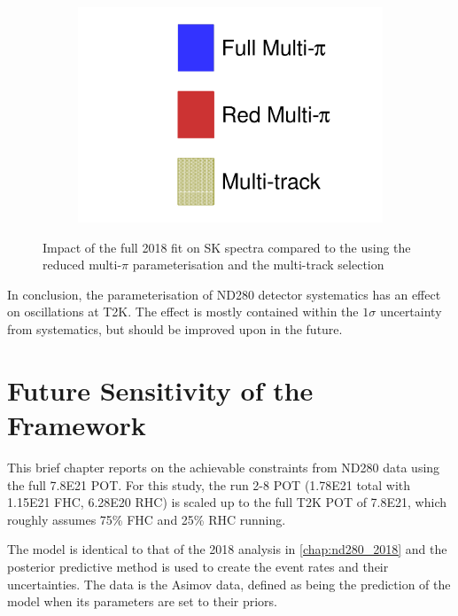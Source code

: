 \begin{figure}[h]
\begin{subfigure}[t]{0.32\textwidth}
		\includegraphics[width=\textwidth, trim={0mm 0mm 0mm 0mm}, clip, page=4]{figures/mach3/2018/data/2018_results_test_spectra_2018_results_test_redcov_spectra_2018_results_test_multitrack_spectra}
	\end{subfigure}
	
	\caption{Impact of the full 2018 fit on SK spectra compared to the using the reduced multi-$\pi$ parameterisation and the multi-track selection}
	\label{fig:sk_2018_nd280param}
\end{figure}

In conclusion, the parameterisation of ND280 detector systematics has an effect on oscillations at T2K. The effect is mostly contained within the $1\sigma$ uncertainty from systematics, but should be improved upon in the future.


\chapter{Future Sensitivity of the Framework}
This brief chapter reports on the achievable constraints from ND280 data using the full 7.8E21 POT. For this study, the run 2-8 POT (1.78E21 total with 1.15E21 FHC, 6.28E20 RHC) is scaled up to the full T2K POT of 7.8E21, which roughly assumes 75\% FHC and 25\% RHC running.

The model is identical to that of the 2018 analysis in \autoref{chap:nd280_2018} and the posterior predictive method is used to create the event rates and their uncertainties. The data is the Asimov data, defined as being the prediction of the model when its parameters are set to their priors.

